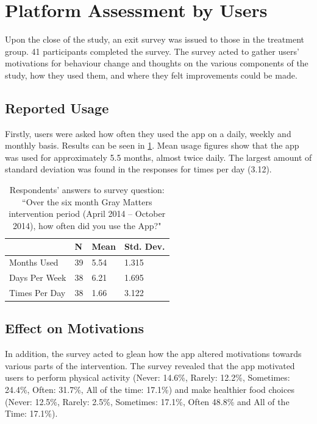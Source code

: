 \section{Platform Assessment by Users}
Upon the close of the study, an exit survey was issued to those in the treatment group. 41 participants completed the survey. The survey acted to gather users’ motivations for behaviour change and thoughts on the various components of the study, how they used them, and where they felt improvements could be made.

\subsection{Reported Usage}
Firstly, users were asked how often they used the app on a daily, weekly and monthly basis. Results can be seen in \ref{tbl: exit-survey-appusage}. Mean usage figures show that the app was used for approximately 5.5 months, almost twice daily. The largest amount of standard deviation was found in the responses for times per day (3.12).

\begin{table}[h]
\centering
\caption{Respondents' answers to survey question: ``Over the six month Gray Matters intervention period (April 2014 – October 2014), how often did you use the App?"}
\label{tbl: exit-survey-appusage}
\begin{tabular}{@{}llll@{}}
\toprule
              & N  & Mean & Std. Dev. \\ \midrule
Months Used   & 39 & 5.54 & 1.315     \\
Days Per Week & 38 & 6.21 & 1.695     \\
Times Per Day & 38 & 1.66 & 3.122     \\ \bottomrule
\end{tabular}
\end{table}

\subsection{Effect on Motivations}
In addition, the survey acted to glean how the app altered motivations towards various parts of the intervention. The survey revealed that the app motivated users to perform physical activity (Never: 14.6\%, Rarely: 12.2\%, Sometimes: 24.4\%, Often: 31.7\%, All of the time: 17.1\%) and make healthier food choices (Never: 12.5\%, Rarely: 2.5\%, Sometimes: 17.1\%, Often 48.8\% and All of the Time: 17.1\%).

